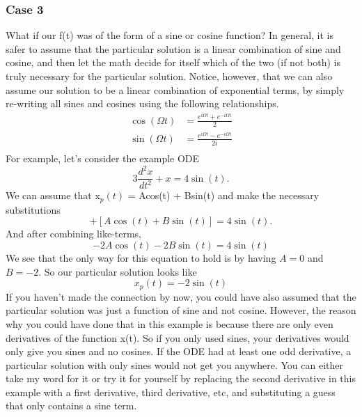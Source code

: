 \documentclass{article}
\newcommand{\be}{\begin{equation}}
\newcommand{\ee}{\end{equation}}
\begin{document}
\subsubsection*{Case 3}
What if our f(t) was of the form of a sine or cosine function?
In general, it is safer to assume that the particular solution is a linear combination of sine and cosine, and then let the math decide for itself which of the two (if not both) is truly necessary for the particular solution.
Notice, however, that we can also assume our solution to be a linear combination of exponential terms, by simply re-writing all sines and cosines using the following relationships.
\be
\begin{split}
    \cos(\Omega t) &= \frac{e^{i\Omega t} + e^{-i\Omega t}}{2}\\
    \sin(\Omega t) &= \frac{e^{i\Omega t} - e^{-i\Omega t}}{2i}\\
\end{split}
\ee
For example, let's consider the example ODE
\be
3 \frac{d^2 x}{dt^2} + x = 4\sin(t) .
\ee
We can assume that x$_p(t)$ = Acos(t) + Bsin(t) and make the necessary substitutions
\be
[-3A\cos{(t)} - 3B\sin{(t)}] + [A\cos{(t)} + B\sin{(t)}] = 4\sin{(t)} .
\ee
And after combining like-terms,
\be
- 2A\cos{(t)} - 2B\sin{(t)} = 4\sin{(t)}
\ee
We see that the only way for this equation to hold is by having $A = 0$ and $B = -2$. So our particular solution looks like
\be
x_p(t) = -2\sin{(t)}
\ee
If you haven't made the connection by now, you could have also assumed that the particular solution was just a function of sine and not cosine.
However, the reason why you could have done that in this example is because there are only even derivatives of the function x(t).
So if you only used sines, your derivatives would only give you sines and no cosines.
If the ODE had at least one odd derivative, a particular solution with only sines would not get you anywhere.
You can either take my word for it or try it for yourself by replacing the second derivative in this example with a first derivative, third derivative, etc, and substituting a guess that only contains a sine term.
\end{document}
